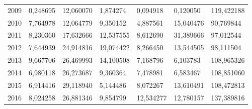\begin{table}
\begin{tabular}{p{1cm}p{2cm}p{2cm}p{2cm}p{2cm}p{2cm}p{2cm}}
 2009 &                                 0,248695 &                       12,060070 &                                    1,874274 &                        0,094918 &                      0,120050 & 119,422188 \\
 2010 &                                 7,764978 &                       12,064779 &                                    9,350152 &                        4,887561 &                     15,040476 &  90,769844 \\
 2011 &                                 8,230360 &                       17,632666 &                                   12,537555 &                        8,612690 &                     31,389666 &  97,012544 \\
 2012 &                                 7,644939 &                       24,914816 &                                   19,074422 &                        8,266450 &                     13,544505 &  98,111504 \\
 2013 &                                 9,667706 &                       26,469993 &                                   14,100508 &                        7,168796 &                      6,103783 & 108,965326 \\
 2014 &                                 6,980118 &                       26,273687 &                                    9,360364 &                        7,478981 &                      6,583467 & 108,851060 \\
 2015 &                                 6,914416 &                       29,118940 &                                    5,144486 &                        8,072267 &                     13,610491 & 108,472813 \\
 2016 &                                 8,024258 &                       26,881346 &                                    9,854799 &                       12,534277 &                     12,780157 & 137,389816 \\
\bottomrule
\end{tabular}
\end{table}
